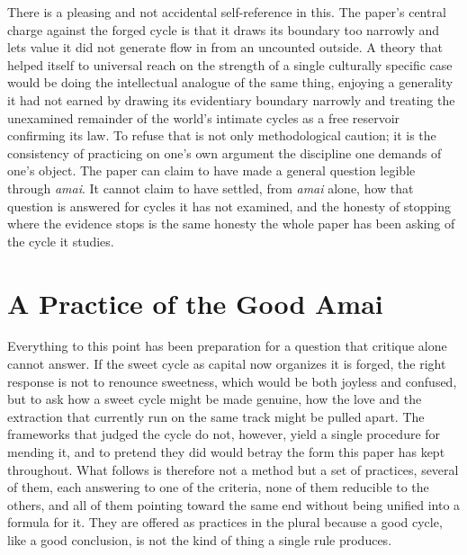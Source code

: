 There is a pleasing and not accidental self-reference in this. The paper's central charge against the forged cycle is that it draws its boundary too narrowly and lets value it did not generate flow in from an uncounted outside. A theory that helped itself to universal reach on the strength of a single culturally specific case would be doing the intellectual analogue of the same thing, enjoying a generality it had not earned by drawing its evidentiary boundary narrowly and treating the unexamined remainder of the world's intimate cycles as a free reservoir confirming its law. To refuse that is not only methodological caution; it is the consistency of practicing on one's own argument the discipline one demands of one's object. The paper can claim to have made a general question legible through \textit{amai}. It cannot claim to have settled, from \textit{amai} alone, how that question is answered for cycles it has not examined, and the honesty of stopping where the evidence stops is the same honesty the whole paper has been asking of the cycle it studies.

\section{A Practice of the Good Amai}

Everything to this point has been preparation for a question that critique alone cannot answer. If the sweet cycle as capital now organizes it is forged, the right response is not to renounce sweetness, which would be both joyless and confused, but to ask how a sweet cycle might be made genuine, how the love and the extraction that currently run on the same track might be pulled apart. The frameworks that judged the cycle do not, however, yield a single procedure for mending it, and to pretend they did would betray the form this paper has kept throughout. What follows is therefore not a method but a set of practices, several of them, each answering to one of the criteria, none of them reducible to the others, and all of them pointing toward the same end without being unified into a formula for it. They are offered as practices in the plural because a good cycle, like a good conclusion, is not the kind of thing a single rule produces.

